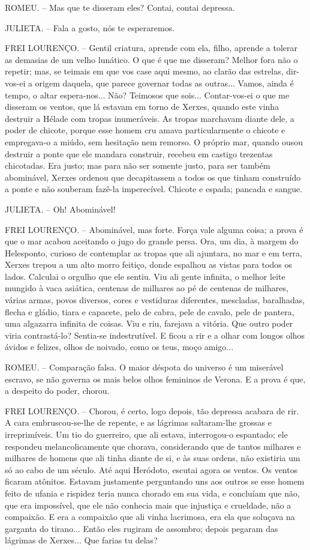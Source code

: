 ROMEU. -- Mas que te disseram eles? Contai, contai depressa.

JULIETA. -- Fala a gosto, nós te esperaremos.

FREI LOURENÇO. -- Gentil criatura, aprende com ela, filho, aprende a
tolerar as demasias de um velho lunático. O que é que me disseram?
Melhor fora não o repetir; mas, se teimais em que vos case aqui mesmo,
ao clarão das estrelas, dir-vos-ei a origem daquela, que parece governar
todas as outras... Vamos, ainda é tempo, o altar espera-nos... Não?
Teimosos que sois... Contar-vos-ei o que me disseram os ventos, que lá
estavam em torno de Xerxes, quando este vinha destruir a Hélade com
tropas inumeráveis. As tropas marchavam diante dele, a poder de chicote,
porque esse homem cru amava particularmente o chicote e empregava-o a
miúdo, sem hesitação nem remorso. O próprio mar, quando ousou destruir a
ponte que ele mandara construir, recebeu em castigo trezentas
chicotadas. Era justo; mas para não ser somente justo, para ser também
abominável, Xerxes ordenou que decapitassem a todos os que tinham
construído a ponte e não souberam fazê-la imperecível. Chicote e espada;
pancada e sangue.

JULIETA. -- Oh! Abominável!

FREI LOURENÇO. -- Abominável, mas forte. Força vale alguma coisa; a
prova é que o mar acabou aceitando o jugo do grande persa. Ora, um dia,
à margem do Helesponto, curioso de contemplar as tropas que ali
ajuntara, no mar e em terra, Xerxes trepou a um alto morro feitiço,
donde espalhou as vistas para todos os lados. Calculai o orgulho que ele
sentiu. Viu ali gente infinita, o melhor leite mungido à vaca asiática,
centenas de milhares ao pé de centenas de milhares, várias armas, povos
diversos, cores e vestiduras diferentes, mescladas, baralhadas, flecha e
gládio, tiara e capacete, pelo de cabra, pele de cavalo, pele de
pantera, uma algazarra infinita de coisas. Viu e riu, farejava a
vitória. Que outro poder viria contrastá-lo? Sentia-se indestrutível. E
ficou a rir e a olhar com longos olhos ávidos e felizes, olhos de
noivado, como os teus, moço amigo...

ROMEU. -- Comparação falsa. O maior déspota do universo é um miserável
escravo, se não governa os mais belos olhos femininos de Verona. E a
prova é que, a despeito do poder, chorou.

FREI LOURENÇO. -- Chorou, é certo, logo depois, tão depressa acabara de
rir. A cara embruscou-se-lhe de repente, e as lágrimas saltaram-lhe
grossas e irreprimíveis. Um tio do guerreiro, que ali estava,
interrogou-o espantado; ele respondeu melancolicamente que chorava,
considerando que de tantos milhares e milhares de homens que ali tinha
diante de si, e às suas ordens, não existiria um só ao cabo de um
século. Até aqui Heródoto, escutai agora os ventos. Os ventos ficaram
atônitos. Estavam justamente perguntando uns aos outros se esse homem
feito de ufania e rispidez teria nunca chorado em sua vida, e concluíam
que não, que era impossível, que ele não conhecia mais que injustiça e
crueldade, não a compaixão. E era a compaixão que ali vinha lacrimosa,
era ela que soluçava na garganta do tirano... Então eles rugiram de
assombro; depois pegaram das lágrimas de Xerxes... Que farias tu delas?


